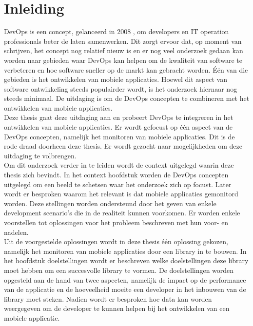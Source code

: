 \chapter{Inleiding}
\label{inleiding}


DevOps is een concept, gelanceerd in 2008 \cite{DevOpsWiki}, om developers en IT operation professionals beter de laten samenwerken. Dit zorgt ervoor dat, op moment van schrijven, het concept nog relatief nieuw is en er nog veel onderzoek gedaan kan worden naar gebieden waar DevOps kan helpen om de kwaliteit van software te verbeteren en hoe software sneller op de markt kan gebracht worden. \'E\'en van die gebieden is het ontwikkelen van mobiele applicaties. Hoewel dit aspect van software ontwikkeling steeds populairder wordt, is het onderzoek hiernaar nog steeds minimaal. De uitdaging is om de DevOps concepten te combineren met het ontwikkelen van mobiele applicaties. \\

Deze thesis gaat deze uitdaging aan en probeert DevOps te integreren in het ontwikkelen van mobiele applicaties. Er wordt gefocust op \'e\'en aspect van de DevOps concepten, namelijk het monitoren van mobiele applicaties. Dit is de rode draad doorheen deze thesis. Er wordt gezocht naar mogelijkheden om deze uitdaging te volbrengen. \\

Om dit onderzoek verder in te leiden wordt de context uitgelegd waarin deze thesis zich bevindt. In het context hoofdstuk worden de DevOps concepten uitgelegd om een beeld te schetsen waar het onderzoek zich op focust. Later wordt er besproken waarom het relevant is dat mobiele applicaties gemonitord worden. Deze stellingen worden ondersteund door het geven van enkele development scenario's die in de realiteit kunnen voorkomen. Er worden enkele voorstellen tot oplossingen voor het probleem beschreven met hun voor- en nadelen.\\

Uit de voorgestelde oplossingen wordt in deze thesis \'e\'en oplossing gekozen, namelijk het monitoren van mobiele applicaties door een library in te bouwen. In het hoofdstuk doelstellingen wordt er beschreven welke doelstellingen deze library moet hebben om een succesvolle library te vormen. De doelstellingen worden opgesteld aan de hand van twee aspecten, namelijk de impact op de performance van de applicatie en de hoeveelheid moeite een developer in het inbouwen van de library moet steken. Nadien wordt er besproken hoe data kan worden weergegeven om de developer te kunnen helpen bij het ontwikkelen van een mobiele applicatie.\\

